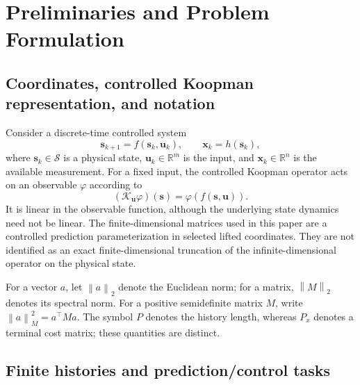 ﻿\documentclass[journal]{IEEEtran}
\newcommand{\vx}{\mathbf{x}}
\newcommand{\vu}{\mathbf{u}}
\newcommand{\vs}{\mathbf{s}}
\newcommand{\R}{\mathbb{R}}
\newcommand{\norm}[1]{\left\lVert #1\right\rVert}
\begin{document}
\section{Preliminaries and Problem Formulation}
\label{sec:prelim}

\subsection{Coordinates, controlled Koopman representation, and notation}

Consider a discrete-time controlled system
\begin{equation}
    \vs_{k+1}=f(\vs_k,\vu_k),\qquad \vx_k=h(\vs_k),
    \label{eq:physical_system}
\end{equation}
where $\vs_k\in\mathcal S$ is a physical state, $\vu_k\in\R^m$ is the input, and $\vx_k\in\R^n$ is the available measurement. For a fixed input, the controlled Koopman operator acts on an observable $\varphi$ according to
\begin{equation}
    (\mathcal K_{\vu}\varphi)(\vs)=\varphi(f(\vs,\vu)).
    \label{eq:koopman_operator}
\end{equation}
It is linear in the observable function, although the underlying state dynamics need not be linear. The finite-dimensional matrices used in this paper are a controlled prediction parameterization in selected lifted coordinates. They are not identified as an exact finite-dimensional truncation of the infinite-dimensional operator on the physical state.

For a vector $a$, let $\norm{a}_2$ denote the Euclidean norm; for a matrix, $\norm{M}_2$ denotes its spectral norm. For a positive semidefinite matrix $M$, write $\norm{a}_M^2=a^\top M a$. The symbol $P$ denotes the history length, whereas $P_x$ denotes a terminal cost matrix; these quantities are distinct.

\subsection{Finite histories and prediction/control tasks}
\end{document}

